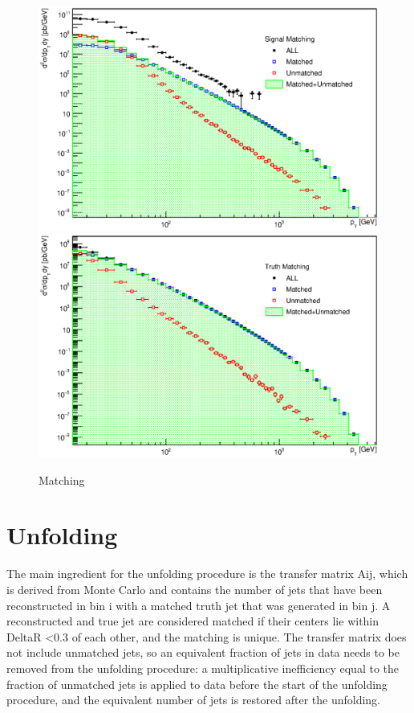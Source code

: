 \begin{figure}[p]
  \centering
  \includegraphics[width=\textwidth]{Chapter3/SignalMatching.eps}
  \includegraphics[width=\textwidth]{Chapter3/TruthMatching.eps}
  \caption{Matching}
  \label{fig:Matching}
\end{figure}

\section{Unfolding}

The main ingredient for the unfolding procedure is the transfer matrix Aij,
which is derived from Monte Carlo and contains the number of jets that have been
reconstructed in bin i with a matched truth jet that was generated in bin j. A
reconstructed and true jet are considered matched if their centers lie within
DeltaR <0.3 of each other, and the matching is unique. The transfer matrix does not
include unmatched jets, so an equivalent fraction of jets in data needs to be
removed from the unfolding procedure: a multiplicative inefficiency equal to the
fraction of unmatched jets is applied to data before the start of the unfolding
procedure, and the equivalent number of jets is restored after the unfolding.

